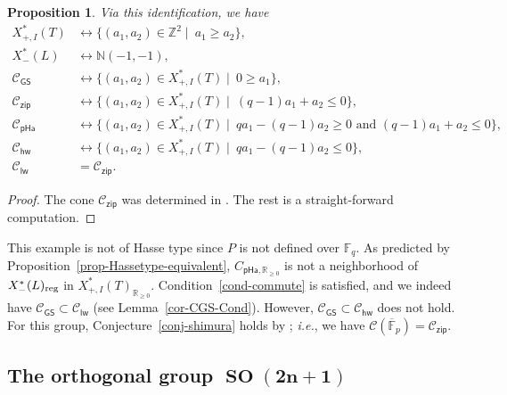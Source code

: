 \documentclass[11pt]{amsart}
\numberwithin{equation}{section}
\newtheorem{proposition}[theorem]{Proposition}
\theoremstyle{definition}
\theoremstyle{remark}
\newcommand{\pha}{\mathsf{pHa}}
\newcommand{\zipsf}{\mathsf{zip}}
\newcommand{\GSsf}{\mathsf{GS}}
\newcommand{\lwsf}{\mathsf{lw}}
\newcommand{\hwsf}{\mathsf{hw}}
\newcommand{\Ccal}{{\mathcal C}}
\newcommand{\FF}{\mathbb{F}}
\newcommand{\NN}{\mathbb{N}}
\newcommand{\RR}{\mathbb{R}}
\newcommand{\ZZ}{\mathbb{Z}}
\newcommand{\reg}{{\rm reg}}
\DeclareMathOperator{\SO}{SO}
\begin{document}
\begin{proposition}
Via this identification, we have
\begin{align*}
    X^*_{+,I}(T) & \leftrightarrow  \{ (a_1,a_2)\in \ZZ^2 \mid \  a_1\geq a_2\}, \\
    X_{-}^*(L) & \leftrightarrow  \NN(-1,-1), \\ 
    \Ccal_{\GSsf} & \leftrightarrow  \{ (a_1,a_2)\in X^*_{+,I}(T) \mid \  0\geq a_1 \}, \\
     \Ccal_{\zipsf} & \leftrightarrow  \{ (a_1,a_2)\in X^*_{+,I}(T) \mid \  (q-1)a_1+a_2\leq 0 \},    \\  
    \Ccal_{\pha} & \leftrightarrow  \{ (a_1,a_2)\in X^*_{+,I}(T) \mid \  qa_1-(q-1)a_2\geq 0 \textrm{ and } (q-1)a_1+a_2\leq 0\}, \\
    \Ccal_{\hwsf} & \leftrightarrow  \{ (a_1,a_2)\in X^*_{+,I}(T) \mid \  qa_1-(q-1)a_2\leq 0 \}, \\
    \Ccal_{\lwsf} & =  \Ccal_{\zipsf}.
\end{align*}
\end{proposition}

\begin{proof}
The cone $\Ccal_{\zipsf}$ was determined in \cite[Corollary 6.3.3]{Imai-Koskivirta-vector-bundles}. 
The rest is a straight-forward computation.
\end{proof}

This example is not of Hasse type since $P$ is not defined over $\FF_q$. As predicted by Proposition~\ref{prop-Hassetype-equivalent}, $C_{\pha, \RR_{\geq 0}}$ is not a neighborhood of $X^*_{-}(L)_{\reg}$ in $X_{+,I}^*(T)_{\RR_{\geq 0}}$. Condition~\ref{cond-commute} is satisfied, and we  indeed have $\Ccal_{\GSsf}\subset \Ccal_{\lwsf}$ (see Lemma~\ref{cor-CGS-Cond}). 
However, $\Ccal_{\GSsf}\subset \Ccal_{\hwsf}$ does not hold. For this group, Conjecture~\ref{conj-shimura} holds by \cite[Theorem 4.3.3]{Goldring-Koskivirta-divisibility}; \textit{i.e.}, we have $\Ccal(\overline{\FF}_p)=\Ccal_{\zipsf}$.


\subsection{The orthogonal group $\boldsymbol{\SO(2n+1)}$} \label{subsec-orthogonal}
\end{document}
